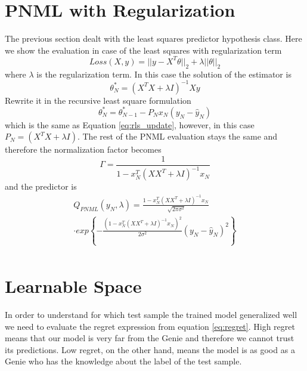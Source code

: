 \documentclass[letterpaper, 10 pt, conference]{ieeeconf}  %
\begin{document}
\section{PNML with Regularization} \label{sec:PNMLwithReg}
The previous section dealt with the least squares predictor hypothesis class. Here we show the evaluation in case of the least squares with regularization term
\begin{equation}
Loss(X,y)= ||y-X^T \theta||_2 + \lambda ||\theta||_2
\end{equation}
where $\lambda$ is the regularization term.
In this case the solution of the estimator is
\begin{equation}
\theta ^*_N = (X^T X+ \lambda I)^{-1} X y
\end{equation}
Rewrite it in the recursive least square formulation 
\begin{equation}
\theta ^*_N=\theta^*_{N-1} - P_N x_N (y_N - \hat{y}_N)
\end{equation}
which is the same as Equation \ref{eq:rls_update}, however, in this case $P_N= (X^T X+ \lambda I)$. The rest of the PNML evaluation stays the same and therefore the normalization factor becomes
\begin{equation}
\Gamma =\frac{1}{1 - x_N^T (XX^T+ \lambda I)^{-1} x_N } 
\end{equation}
and the predictor is 
\begin{multline} \label{eq:pnml_least_sqaures}
Q_{PNML}(y_N, \lambda)
=\frac{1 - x_N^T (XX^T + \lambda I)^{-1} x_N }{\sqrt[]{2\pi\sigma^2}} \\
\cdot exp\left\{-\frac{(1 - x_N^T (XX^T + \lambda I)^{-1} x_N )^2 }{2\sigma^2}\left(y_N- \hat{y}_N \right)^2\right\} \\
\end{multline}

\newpage
\section{Learnable Space} \label{sec:learnable_space}
In order to understand for which test sample the trained model generalized well we need to evaluate the regret expression from equation \ref{eq:regret}. High regret means that our model is very far from the Genie and therefore we cannot trust its predictions. Low regret, on the other hand, means the model is as good as a Genie who has the knowledge about the label of the test sample.
\end{document}
